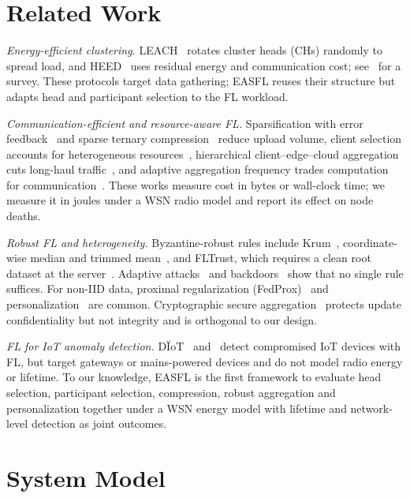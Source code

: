\documentclass[journal,onecolumn,draftclsnofoot,12pt]{IEEEtran}
\begin{document}
\section{Related Work}
\textit{Energy-efficient clustering.} LEACH~\cite{heinzelman2002} rotates cluster heads (CHs) randomly to spread load, and HEED~\cite{younis2004} uses residual energy and communication cost; see~\cite{abbasi2007} for a survey. These protocols target data gathering; EASFL reuses their structure but adapts head and participant selection to the FL workload.

\textit{Communication-efficient and resource-aware FL.} Sparsification with error feedback~\cite{lin2018dgc,stich2018} and sparse ternary compression~\cite{sattler2020} reduce upload volume, client selection accounts for heterogeneous resources~\cite{nishio2019}, hierarchical client--edge--cloud aggregation cuts long-haul traffic~\cite{liu2020hfl}, and adaptive aggregation frequency trades computation for communication~\cite{wang2019adaptive}. These works measure cost in bytes or wall-clock time; we measure it in joules under a WSN radio model and report its effect on node deaths.

\textit{Robust FL and heterogeneity.} Byzantine-robust rules include Krum~\cite{blanchard2017}, coordinate-wise median and trimmed mean~\cite{yin2018}, and FLTrust, which requires a clean root dataset at the server~\cite{cao2021}. Adaptive attacks~\cite{fang2020} and backdoors~\cite{bagdasaryan2020} show that no single rule suffices. For non-IID data, proximal regularization (FedProx)~\cite{li2020fedprox} and personalization~\cite{arivazhagan2019,tan2023} are common. Cryptographic secure aggregation~\cite{bonawitz2017} protects update confidentiality but not integrity and is orthogonal to our design.

\textit{FL for IoT anomaly detection.} D\"IoT~\cite{nguyen2019diot} and~\cite{mothukuri2022} detect compromised IoT devices with FL, but target gateways or mains-powered devices and do not model radio energy or lifetime. To our knowledge, EASFL is the first framework to evaluate head selection, participant selection, compression, robust aggregation and personalization together under a WSN energy model with lifetime and network-level detection as joint outcomes.

\section{System Model}\label{sec:model}
\end{document}
